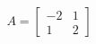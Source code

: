 \documentclass[preview]{standalone}
\begin{document}
\begin{align*}
A = \begin{bmatrix} -2 & 1 \\ 1 & 2 \end{bmatrix}
\end{align*}
\end{document}
